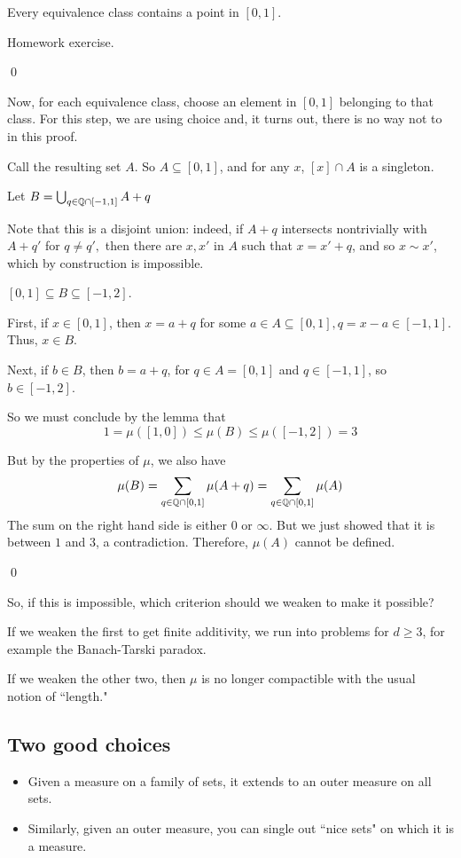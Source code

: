 \documentclass[x11names,reqno,14pt]{extarticle}
\begin{document}
\claim

Every equivalence class contains a point in $[0, 1]$. 

\proof

Homework exercise. 

\qed 

Now, for each equivalence class, choose an element in $[0, 1]$ belonging to that class. For this step, we are using choice and, it turns out, there is no way not to in this proof. 

Call the resulting set $A$. So $A \subseteq [0, 1]$, and for any $x$, $[x] \cap A$ is a singleton. 

Let $B = \bigcup_{q\in\mathbb{Q}\cap[-1,1]}A + q$

Note that this is a disjoint union: indeed, if $A + q$ intersects nontrivially with $A + q'$ for $q \neq q',$ then there are $x, x'$ in $A$ such that $x = x' + q$, and so $x \sim x'$, which by construction is impossible. 

\claim 
$[0, 1]\subseteq B \subseteq[-1, 2]$. 

\proof

First, if $x \in [0, 1]$, then $x = a + q$ for some $a \in A\subseteq[0, 1], q = x - a \in [-1, 1]$. Thus, $x \in B$. 

Next, if $b \in B$, then $b = a + q$, for $q \in A = [0, 1]$ and $q \in [-1, 1]$, so $b \in [-1, 2]$. 

So we must conclude by the lemma that 
\[
1 = \mu([1, 0]) \leq \mu(B) \leq \mu([-1, 2]) = 3
\] 

But by the properties of $\mu$, we also have
\[
\mu(B) = \sum_{q\in\mathbb{Q}\cap[0, 1]}\mu(A + q) = \sum_{q\in\mathbb{Q}\cap[0,1]}\mu(A)
\]
The sum on the right hand side is either $0$ or $\infty$. But we just showed that it is between $1$ and $3$, a contradiction. Therefore, $\mu(A)$ cannot be defined. 

\qed

So, if this is impossible, which criterion should we weaken to make it possible? 

If we weaken the first to get finite additivity, we run into problems for $d \geq 3$, for example the Banach-Tarski paradox. 

If we weaken the other two, then $\mu$ is no longer compactible with the usual notion of ``length." 

\subsection*{Two good choices}
\begin{itemize}
\item Given a measure on a family of sets, it extends to an outer measure on all sets. 
\item Similarly, given an outer measure, you can single out ``nice sets" on which it is a measure. 
\end{itemize}
\end{document}

